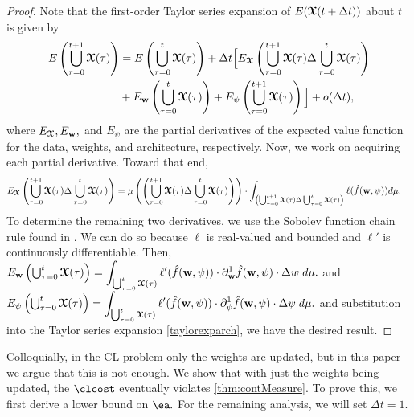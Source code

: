 \begin{proof}
    Note that the first-order Taylor series expansion of $E(\boldsymbol{\mathcal{X}}(t+\Delta t))$ about  $t$ is given by
    \begin{align}
        E\left(\bigcup_{\tau = 0}^{t+1}\boldsymbol{\mathcal{X}}(\tau)\right) & = E\left(\bigcup_{\tau = 0}^{t}\boldsymbol{\mathcal{X}}(\tau)\right) + \Delta t\Big[ E_{\boldsymbol{\mathcal{X}}} \left(\bigcup_{\tau = 0}^{t+1}\boldsymbol{\mathcal{X}}(\tau)\Delta \bigcup_{\tau = 0}^{t}\boldsymbol{\mathcal{X}}(\tau)\right) \nonumber \\
        & + E_{\boldsymbol{\mathrm{w}}}\left(\bigcup_{\tau = 0}^{t}\boldsymbol{\mathcal{X}}(\tau)\right) + E_\psi\left(\bigcup_{\tau = 0}^{t+1}\boldsymbol{\mathcal{X}}(\tau)\right)\Big] + o(\Delta t),\label{taylorexparch}
    \end{align}
    where $E_{\boldsymbol{\mathcal{X}}} , E_{\boldsymbol{\mathrm{w}}},$ and $E_\psi$ are the partial derivatives of the expected value function for the data, weights, and architecture, respectively. Now, we work on acquiring each partial derivative. Toward that end, 
    \begin{align}
        E_{\boldsymbol{\mathcal{X}}} \left(\bigcup_{\tau = 0}^{t+1}\boldsymbol{\mathcal{X}}(\tau)\Delta \bigcup_{\tau = 0}^{t}\boldsymbol{\mathcal{X}}(\tau)\right) & =\mu\left( \left(\bigcup_{\tau = 0}^{t+1}\boldsymbol{\mathcal{X}}(\tau)\Delta \bigcup_{\tau = 0}^{t}\boldsymbol{\mathcal{X}}(\tau)\right)\right)\cdot \displaystyle\int_{\left(\bigcup_{\tau = 0}^{t+1}\boldsymbol{\mathcal{X}}(\tau)\Delta \bigcup_{\tau = 0}^{t}\boldsymbol{\mathcal{X}}(\tau)\right)} \ell(\hat{f}(\boldsymbol{\mathrm{w}},\psi))d\mu.\label{E_X1}
    \end{align}
    To determine the remaining two derivatives, we use the Sobolev function chain rule found in \cite{evans2022partial}. We can do so because $\ell$ is real-valued and bounded and $\ell'$ is continuously differentiable. Then, $E_{\boldsymbol{\mathrm{w}}}\left(\bigcup_{\tau = 0}^{t}\boldsymbol{\mathcal{X}}(\tau)\right) = \displaystyle\int_{\bigcup_{\tau = 0}^{t}\boldsymbol{\mathcal{X}}(\tau)} \ell'(\hat{f}(\boldsymbol{\mathrm{w}},\psi))\cdot \partial_{\boldsymbol{\mathrm{w}}}^1 \hat{f}(\boldsymbol{\mathrm{w}},\psi)\cdot \Delta w \hspace{1mm}  d\mu.\label{E_w}$ and $E_{\psi}\left(\bigcup_{\tau = 0}^{t}\boldsymbol{\mathcal{X}}(\tau)\right) = \displaystyle\int_{\bigcup_{\tau = 0}^{t}\boldsymbol{\mathcal{X}}(\tau)} \ell'(\hat{f}(\boldsymbol{\mathrm{w}},\psi))\cdot \partial_\psi^1 \hat{f}(\boldsymbol{\mathrm{w}},\psi)\cdot \Delta \psi \hspace{1mm}  d\mu.\label{E_psi}$ and
    substitution into the Taylor series expansion \eqref{taylorexparch}, we have the desired result.
\end{proof}

Colloquially, in the CL problem only the weights are updated, but in this paper we argue that this is not enough. We show that  with just the weights being updated, the $\clcost$ eventually violates \cref{thm:contMeasure}. To prove this, we first derive a lower bound on $\ea.$ For the remaining analysis, we will set  $ \Delta t = 1.$

